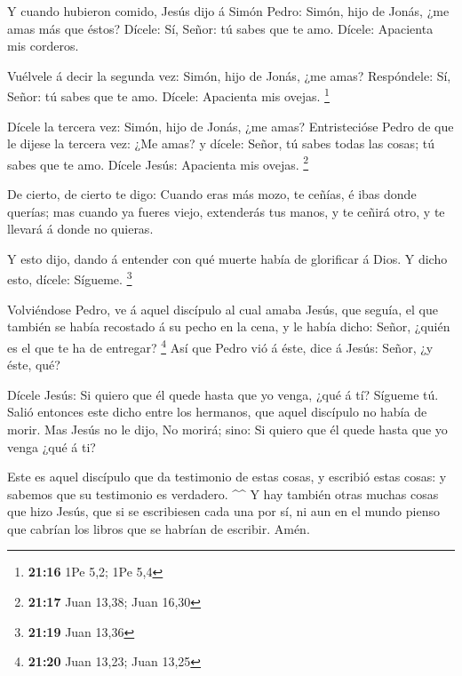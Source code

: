  Y cuando hubieron comido, Jesús dijo á Simón Pedro: Simón,
hijo de Jonás, ¿me amas más que éstos? Dícele: Sí, Señor: tú sabes que
te amo. Dícele: Apacienta mis corderos.

 Vuélvele á decir la segunda vez: Simón, hijo de Jonás, ¿me
amas? Respóndele: Sí, Señor: tú sabes que te amo. Dícele: Apacienta mis
ovejas. \footnote{\textbf{21:16} 1Pe 5,2; 1Pe 5,4}

 Dícele la tercera vez: Simón, hijo de Jonás, ¿me amas?
Entristecióse Pedro de que le dijese la tercera vez: ¿Me amas? y dícele:
Señor, tú sabes todas las cosas; tú sabes que te amo. Dícele Jesús:
Apacienta mis ovejas. \footnote{\textbf{21:17} Juan 13,38; Juan 16,30}

 De cierto, de cierto te digo: Cuando eras más mozo, te
ceñías, é ibas donde querías; mas cuando ya fueres viejo, extenderás tus
manos, y te ceñirá otro, y te llevará á donde no quieras.

 Y esto dijo, dando á entender con qué muerte había de
glorificar á Dios. Y dicho esto, dícele: Sígueme. \footnote{\textbf{21:19}
  Juan 13,36}

 Volviéndose Pedro, ve á aquel discípulo al cual amaba
Jesús, que seguía, el que también se había recostado á su pecho en la
cena, y le había dicho: Señor, ¿quién es el que te ha de entregar?
\footnote{\textbf{21:20} Juan 13,23; Juan 13,25}  Así que
Pedro vió á éste, dice á Jesús: Señor, ¿y éste, qué?

 Dícele Jesús: Si quiero que él quede hasta que yo venga,
¿qué á tí? Sígueme tú.  Salió entonces este dicho entre los
hermanos, que aquel discípulo no había de morir. Mas Jesús no le dijo,
No morirá; sino: Si quiero que él quede hasta que yo venga ¿qué á ti?

 Este es aquel discípulo que da testimonio de estas cosas,
y escribió estas cosas: y sabemos que su testimonio es verdadero.
\^{}\^{}  Y hay también otras muchas cosas que hizo Jesús,
que si se escribiesen cada una por sí, ni aun en el mundo pienso que
cabrían los libros que se habrían de escribir. Amén.
